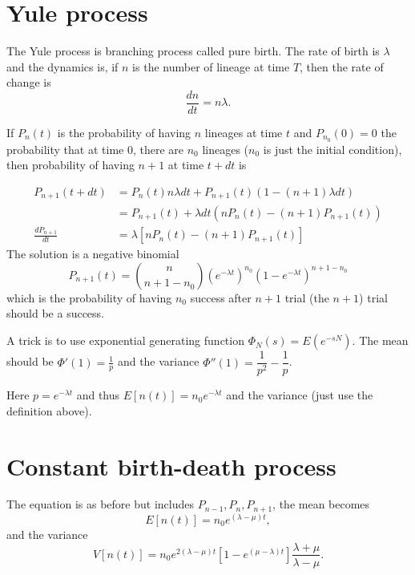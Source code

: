 \documentclass[12pt]{article}
\begin{document}
\maketitle

\section{Yule process}
\label{sec:Yule}
The Yule process is branching process called pure birth.
The rate of birth is $\lambda$ and the dynamics is,
if $n$ is the number of lineage at time $T$, then the rate of change is
\begin{equation*}
  \frac{d n}{dt} = n \lambda.
\end{equation*}

If $P_{n}(t)$ is the probability of having $n$ lineages at time $t$ and $P_{n_0}(0) =  0$ the probability that at time 0, there are $n_0$ lineages ($n_0$ is just the initial condition), then probability of having $n+1$ at time $t+dt$ is

 \begin{align*}
  P_{n+1} (t + dt)  & = P_n(t) n \lambda dt  + P_{n+1}(t) (1  - (n+1) \lambda dt) \\
                   & =  P_{n+1}(t)  + \lambda dt (n P_n(t)  - (n+1) P_{n+1}(t))\\
 \frac{d P_{n+1}}{dt} & = \lambda \left[n P_n(t) - (n+1) P_{n+1}(t)\right]
\end{align*}
%
The solution is a negative binomial
\begin{equation}
  P_{n+1}(t)  = \binom{n}{n+1 - n_0}  \left( e^{-\lambda t}\right)^{n_0} \left( 1 - e^{-\lambda t} \right)^{n+1 - n_0}
\end{equation}
which is the probability of having $n_0$ success after $n+1$ trial (the $n+1$) trial should be a success. %

A trick is to use exponential generating function $\Phi_N(s) = E(e^{-s N})$.
The mean should be $\Phi'(1)  =  \frac{1}{p}$ and the variance $\Phi''(1)  =  \dfrac{1}{p^2} - \dfrac{1}{p}$.

Here $p = e^{-\lambda t}$ and thus $E[n(t)]  = n_0 e^{-\lambda t}$ and the variance (just use the definition above).

\section{Constant birth-death process}
\label{sec:bd}
The equation is as before but includes $P_{n-1}, P_n, P_{n+1}$, the mean becomes
\begin{equation*}
  E[n(t)] = n_0 e^{(\lambda - \mu) t},
\end{equation*}
and the variance
\begin{equation*}
  V[n(t)] = n_0 e^{2(\lambda - \mu) t}\left[ 1 - e^{(\mu  - \lambda) t } \right] \dfrac{\lambda + \mu}{\lambda - \mu}.
\end{equation*}
\end{document}
